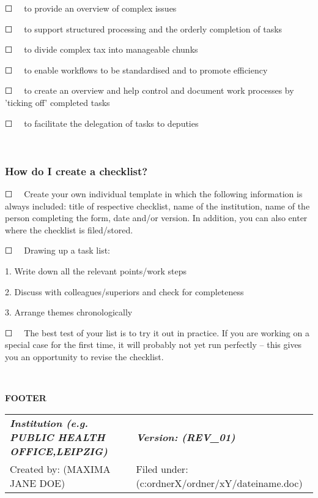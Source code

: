 \documentclass{article}
\begin{document}
☐   to provide an overview of complex issues


☐   to support structured processing and the orderly completion of tasks


☐   to divide complex tax into manageable chunks


☐   to enable workflows to be standardised and to promote efficiency 


☐   to create an overview and help control and document work processes by 'ticking off' completed tasks


☐   to facilitate the delegation of tasks to deputies


 


\subsubsection{How do I create a checklist?}\label{H6679445}



☐   Create your own individual template in which the following information is always included: title of respective checklist, name of the institution, name of the person completing the form, date and/or version. In addition, you can also enter where the checklist is filed/stored.


☐   Drawing up a task list: 


1. Write down all the relevant points/work steps


2. Discuss with colleagues/superiors and check for completeness


3. Arrange themes chronologically


☐   The best test of your list is to try it out in practice. If you are working on a special case for the first time, it will probably not yet run perfectly – this gives you an opportunity to revise the checklist.


 


\textbf{FOOTER}


\begin{tabu} to \textwidth { |X|X| }
\hline



\emph{\textbf{Institution (e.g. PUBLIC HEALTH OFFICE,LEIPZIG)}} & \emph{\textbf{Version: (REV\_01)}}
 \\


Created by: (MAXIMA JANE DOE) & Filed under: (c:ordnerX/ordner/xY/dateiname.doc)
 \\
\hline

\end{tabu}
\end{document}
